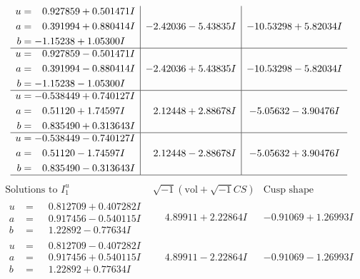 \documentclass[1p]{elsarticle_modified}
\theoremstyle{definition}
\newcommand{\I}{\sqrt{-1}}
\begin{document}
$$\begin{array}{c|c|c}
\begin{aligned}
u &= \phantom{-}0.927859 + 0.501471 I \\
a &= \phantom{-}0.391994 + 0.880414 I \\
b &= -1.15238 + 1.05300 I\end{aligned}
 & -2.42036 - 5.43835 I & -10.53298 + 5.82034 I \\ \hline\begin{aligned}
u &= \phantom{-}0.927859 - 0.501471 I \\
a &= \phantom{-}0.391994 - 0.880414 I \\
b &= -1.15238 - 1.05300 I\end{aligned}
 & -2.42036 + 5.43835 I & -10.53298 - 5.82034 I \\ \hline\begin{aligned}
u &= -0.538449 + 0.740127 I \\
a &= \phantom{-}0.51120 + 1.74597 I \\
b &= \phantom{-}0.835490 + 0.313643 I\end{aligned}
 & \phantom{-}2.12448 + 2.88678 I & -5.05632 - 3.90476 I \\ \hline\begin{aligned}
u &= -0.538449 - 0.740127 I \\
a &= \phantom{-}0.51120 - 1.74597 I \\
b &= \phantom{-}0.835490 - 0.313643 I\end{aligned}
 & \phantom{-}2.12448 - 2.88678 I & -5.05632 + 3.90476 I\\
 \hline 
 \end{array}$$\newpage$$\begin{array}{c|c|c}  
\text{Solutions to }I^u_{1}& \I (\text{vol} + \sqrt{-1}CS) & \text{Cusp shape}\\
 \hline 
\begin{aligned}
u &= \phantom{-}0.812709 + 0.407282 I \\
a &= \phantom{-}0.917456 - 0.540115 I \\
b &= \phantom{-}1.22892 - 0.77634 I\end{aligned}
 & \phantom{-}4.89911 + 2.22864 I & -0.91069 + 1.26993 I \\ \hline\begin{aligned}
u &= \phantom{-}0.812709 - 0.407282 I \\
a &= \phantom{-}0.917456 + 0.540115 I \\
b &= \phantom{-}1.22892 + 0.77634 I\end{aligned}
 & \phantom{-}4.89911 - 2.22864 I & -0.91069 - 1.26993 I \\ \hline\begin{aligned}

\end{aligned}
\end{array}$$
\end{document}
